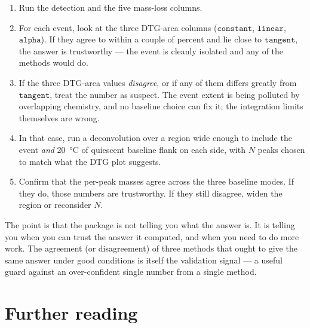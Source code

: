 \documentclass[11pt]{article}
\newcommand{\code}[1]{\texttt{#1}}
\begin{document}
\begin{enumerate}
  \item Run the detection and the five mass-loss columns.
  \item For each event, look at the three DTG-area columns
        ($\code{constant}$, $\code{linear}$, $\code{alpha}$). If they
        agree to within a couple of percent and lie close to
        $\code{tangent}$, the answer is trustworthy --- the event is
        cleanly isolated and any of the methods would do.
  \item If the three DTG-area values \emph{disagree}, or if any of
        them differs greatly from $\code{tangent}$, treat the number
        as suspect. The event extent is being polluted by overlapping
        chemistry, and no baseline choice can fix it; the integration
        limits themselves are wrong.
  \item In that case, run a deconvolution over a region wide enough
        to include the event \emph{and} \qty{20}{\celsius} of
        quiescent baseline flank on each side, with $N$ peaks chosen
        to match what the DTG plot suggests.
  \item Confirm that the per-peak masses agree across the three
        baseline modes. If they do, those numbers are trustworthy. If
        they still disagree, widen the region or reconsider $N$.
\end{enumerate}

The point is that the package is not telling you what the answer is.
It is telling you when you can trust the answer it computed, and when
you need to do more work. The agreement (or disagreement) of three
methods that ought to give the same answer under good conditions is
itself the validation signal --- a useful guard against an over-confident
single number from a single method.

\section*{Further reading}
\end{document}
